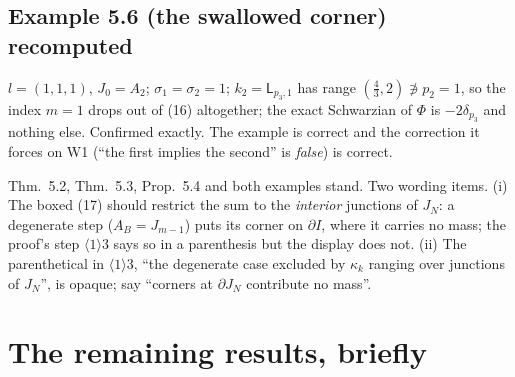 \documentclass[11pt]{article}
\newcommand{\Lp}{\mathsf L}
\theoremstyle{definition}\newtheorem{example}[theorem]{Example}
\begin{document}
\subsection{Example 5.6 (the swallowed corner) recomputed}

$l=(1,1,1)$, $J_0=A_2$; $\sigma_1=\sigma_2=1$; $k_2=\Lp_{p_3,1}$ has range
$(\tfrac43,2)\not\ni p_2=1$, so the index $m=1$ drops out of (16) altogether; the exact
Schwarzian of $\Phi$ is $-2\delta_{p_3}$ and nothing else.  Confirmed exactly.  The
example is correct and the correction it forces on W1 (``the first implies the second'' is
\emph{false}) is correct.

\begin{verdictok}
Thm.~5.2, Thm.~5.3, Prop.~5.4 and both examples stand.  Two wording items.  (i) The boxed
(17) should restrict the sum to the \emph{interior} junctions of $J_N$: a degenerate step
($A_B=J_{m-1}$) puts its corner on $\partial I$, where it carries no mass; the proof's
step $\langle1\rangle3$ says so in a parenthesis but the display does not.  (ii) The
parenthetical in $\langle1\rangle3$, ``the degenerate case excluded by $\kappa_k$ ranging
over junctions of $J_N$'', is opaque; say ``corners at $\partial J_N$ contribute no mass''.
\end{verdictok}

\section{The remaining results, briefly}\label{sec:minor}
\end{document}
